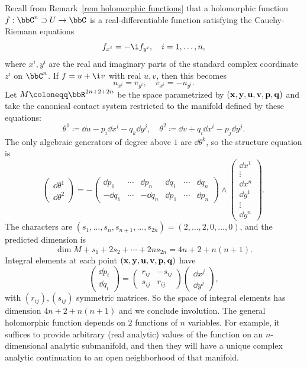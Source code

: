 \begin{example}\label{example cauchy-riemann eds}
    Recall from Remark~\ref{rem holomorphic functions} that a holomorphic function $f:\bbC^n\supset U\to\bbC$ is a real-differentiable function satisfying the Cauchy-Riemann equations
    \[f_{x^i}=-\i f_{y^i},\quad i=1,\ldots,n,\]
    where $x^i,y^i$ are the real and imaginary parts of the standard complex coordinate $z^i$ on $\bbC^n$. If $f=u+\i v$ with real $u,v$, then this becomes 
    \[u_{x^i}=v_{y^i},\quad v_{x^i}=-u_{y^i}.\]
    Let $M\coloneqq \bbR^{2n+2+2n}$ be the space parametrized by $(\bf{x},\bf{y},u,v,\bf{p},\bf{q})$ and take the canonical contact system restricted to the manifold defined by these equations:
    \[\theta^1\coloneqq \dd u-p_i\dd x^i-q_k\dd y^j,\quad \theta^2\coloneqq \dd v+q_i\dd x^i-p_j \dd y^j.\]
    The only algebraic generators of degree above $1$ are $\dd\theta^k$, so the structure equation is
    \[
    \begin{pmatrix}
        \dd\theta^1\\\dd \theta^2
    \end{pmatrix}=
    -\begin{pmatrix}
        \boxed{\dd p_1} & \cdots & \boxed{\dd p_n} & \dd q_1 & \cdots & \dd q_n\\
        \boxed{-\dd q_1} & \cdots & \boxed{-\dd q_n} & \dd p_1 & \cdots & \dd p_n
    \end{pmatrix}\wedge 
    \begin{pmatrix}
        \dd x^1\\
        \vdots \\
        \dd x^n\\
        \dd y^1\\
        \vdots \\
        \dd y^n
    \end{pmatrix}.
    \]
    The characters are $(s_1,\ldots,s_n,s_{n+1},\ldots,s_{2n})=(2,\ldots,2,0,\ldots,0)$, and the predicted dimension is 
    \[\dim M+s_1+2 s_2+\cdots +2n s_{2n}=4n+2+n(n+1).\]
    Integral elements at each point $(\bf{x},\bf{y},u,v,\bf{p},\bf{q})$ have 
    \[\begin{pmatrix}
        \dd p_i\\
        \dd q_i
    \end{pmatrix}=\begin{pmatrix}
        r_{ij} & -s_{ij}\\
        s_{ij} & r_{ij}
    \end{pmatrix}
    \begin{pmatrix}
        \dd x^j \\
        \dd y^j
    \end{pmatrix},
    \]
    with $(r_{ij}),(s_{ij})$ symmetric matrices. So the space of integral elements has dimension $4n+2+n(n+1)$ and we conclude involution. The general holomorphic function depends on $2$ functions of $n$ variables. For example, it suffices to provide arbitrary (real analytic) values of the function on an $n$-dimensional analytic submanifold, and then they will have a unique complex analytic continuation to an open neighborhood of that manifold.


\end{example}
